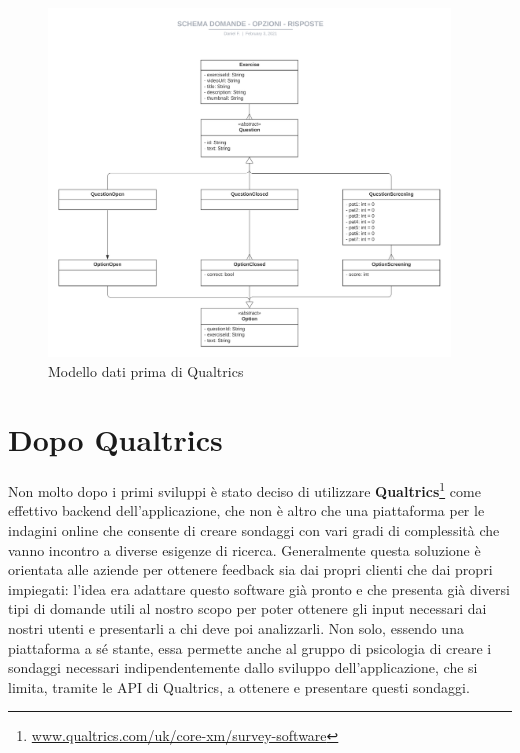 \begin{figure}[h]
\begin{center}
\includegraphics[width=0.95\textwidth]{img/modello_iniziale}
\caption{Modello dati prima di Qualtrics}
\label{fig:modello_iniziale}
\end{center}
\end{figure}


\section{Dopo Qualtrics}
Non molto dopo i primi sviluppi è stato deciso di utilizzare \textbf{Qualtrics}\footnote{\url{www.qualtrics.com/uk/core-xm/survey-software}} come effettivo backend dell'applicazione, che non è altro che una piattaforma per le indagini online che consente di creare sondaggi con vari gradi di complessità che vanno incontro a diverse esigenze di ricerca.
Generalmente questa soluzione è orientata alle aziende per ottenere feedback sia dai propri clienti che dai propri impiegati: l'idea era adattare questo software già pronto e che presenta già diversi tipi di domande utili al nostro scopo per poter ottenere gli input necessari dai nostri utenti e presentarli a chi deve poi analizzarli. Non solo, essendo una piattaforma a sé stante, essa permette anche al gruppo di psicologia di creare i sondaggi necessari indipendentemente dallo sviluppo dell'applicazione, che si limita, tramite le API di Qualtrics, a ottenere e presentare questi sondaggi.

